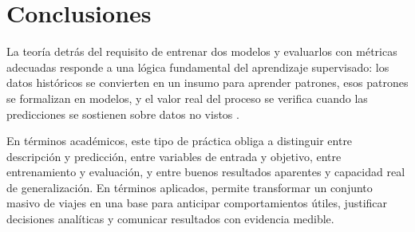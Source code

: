 \documentclass[12pt]{article}
\begin{document}
\section{Conclusiones}
La teoría detrás del requisito de entrenar dos modelos y evaluarlos con métricas adecuadas responde a una lógica fundamental del aprendizaje supervisado: los datos históricos se convierten en un insumo para aprender patrones, esos patrones se formalizan en modelos, y el valor real del proceso se verifica cuando las predicciones se sostienen sobre datos no vistos \cite{gcp_bqml_eval_overview,gcp_predict}.

En términos académicos, este tipo de práctica obliga a distinguir entre descripción y predicción, entre variables de entrada y objetivo, entre entrenamiento y evaluación, y entre buenos resultados aparentes y capacidad real de generalización. En términos aplicados, permite transformar un conjunto masivo de viajes en una base para anticipar comportamientos útiles, justificar decisiones analíticas y comunicar resultados con evidencia medible.

\newpage
\printbibliography
\end{document}
